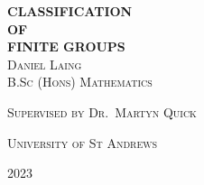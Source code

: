 \begin{titlepage}
\centering
\vspace*{0.12\textheight}
\textbf{\Huge CLASSIFICATION} \\ [\baselineskip]
\textbf{\Large OF} \\ [\baselineskip]
\textbf{\Huge FINITE GROUPS} \\ [\baselineskip]
\textsc{\Large Daniel Laing} \\ [\baselineskip]
\vfill\null%
{\small\scshape B.Sc (Hons) Mathematics}\par
{\small\scshape Supervised by Dr.\ Martyn Quick}\par
{\small\scshape University of St Andrews}\par
{\small\scshape 2023}\par
\end{titlepage}
